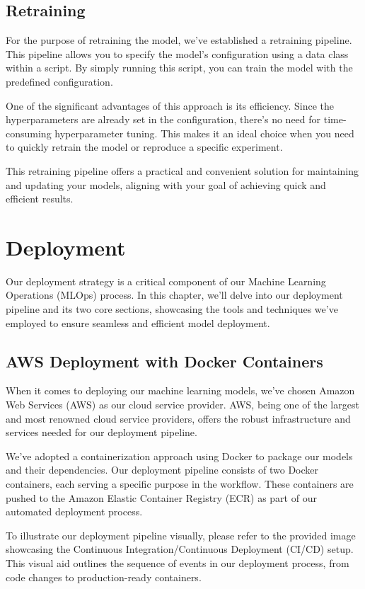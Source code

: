 \documentclass{report}
\begin{document}
\section{Retraining}
For the purpose of retraining the model, we've established a retraining pipeline. This pipeline allows you to specify the model's configuration using a data class within a script. By simply running this script, you can train the model with the predefined configuration. 

One of the significant advantages of this approach is its efficiency. Since the hyperparameters are already set in the configuration, there's no need for time-consuming hyperparameter tuning. This makes it an ideal choice when you need to quickly retrain the model or reproduce a specific experiment.

This retraining pipeline offers a practical and convenient solution for maintaining and updating your models, aligning with your goal of achieving quick and efficient results.

\chapter{Deployment}

Our deployment strategy is a critical component of our Machine Learning Operations (MLOps) process. In this chapter, we'll delve into our deployment pipeline and its two core sections, showcasing the tools and techniques we've employed to ensure seamless and efficient model deployment.

\section{AWS Deployment with Docker Containers}

When it comes to deploying our machine learning models, we've chosen Amazon Web Services (AWS) as our cloud service provider. AWS, being one of the largest and most renowned cloud service providers, offers the robust infrastructure and services needed for our deployment pipeline.

We've adopted a containerization approach using Docker to package our models and their dependencies. Our deployment pipeline consists of two Docker containers, each serving a specific purpose in the workflow. These containers are pushed to the Amazon Elastic Container Registry (ECR) as part of our automated deployment process.

To illustrate our deployment pipeline visually, please refer to the provided image showcasing the Continuous Integration/Continuous Deployment (CI/CD) setup. This visual aid outlines the sequence of events in our deployment process, from code changes to production-ready containers.
\end{document}
